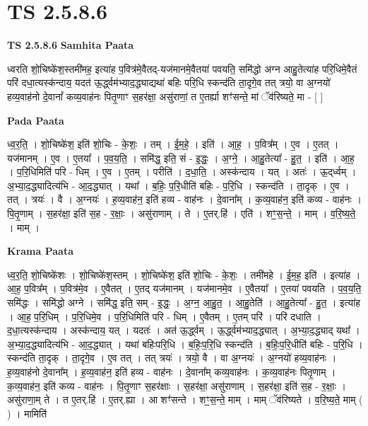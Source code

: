 \documentclass[17pt]{extarticle}
\begin{document}
\section{ TS 2.5.8.6 }

\textbf{TS 2.5.8.6 } \newline
\textbf{Samhita Paata} \newline

ध्वरति शो॒चिष्के॑श॒स्तमी॑मह॒ इत्या॑ह प॒वित्र॑मे॒वैतद्-यज॑मानमे॒वैतया॑ पवयति॒ समि॑द्धो अग्न आहु॒तेत्या॑ह परि॒धिमे॒वैतं परि॑ दधा॒त्यस्क॑न्दाय॒ यदत॑ ऊ॒र्द्ध्वम॑भ्याद॒द्ध्याद्यथा॑ बहिः परि॒धि स्कन्द॑ति ता॒दृगे॒व तत् त्रयो॒ वा अ॒ग्नयो॑ हव्य॒वाह॑नो दे॒वानां᳚ कव्य॒वाह॑नः पितृ॒णाꣳ स॒हर॑क्षा॒ असु॑राणां॒ त ए॒तर्ह्या शꣳ॑सन्ते॒ मां ॅव॑रिष्यते॒ मा - [  ] \newline

\textbf{Pada Paata} \newline

ध्व॒र॒ति॒ । शो॒चिष्के॑श॒ इति॑ शो॒चिः - के॒शः॒ । तम् । ई॒म॒हे॒ । इति॑ । आ॒ह॒ । प॒वित्र᳚म् । ए॒व । ए॒तत् । यज॑मानम् । ए॒व । ए॒तया᳚ । प॒व॒य॒ति॒ । समि॑द्ध॒ इति॒ सं - इ॒द्धः॒ । अ॒ग्ने॒ । आ॒हु॒तेत्या᳚ - हु॒त॒ । इति॑ । आ॒ह॒ । प॒रि॒धिमिति॑ परि - धिम् । ए॒व । ए॒तम् । परीति॑ । द॒धा॒ति॒ । अस्क॑न्दाय । यत् । अतः॑ । ऊ॒द्‌र्ध्वम् । अ॒भ्या॒द॒द्ध्यादित्य॑भि - आ॒द॒द्ध्यात् । यथा᳚ । ब॒हिः॒ प॒रि॒धीति॑ बहिः - प॒रि॒धि । स्कन्द॑ति । ता॒दृक् । ए॒व । तत् । त्रयः॑ । वै । अ॒ग्नयः॑ । ह॒व्य॒वाह॑न॒ इति॑ हव्य - वाह॑नः । दे॒वाना᳚म् । क॒व्य॒वाह॑न॒ इति॑ कव्य - वाह॑नः । पि॒तृ॒णाम् । स॒हर॑क्षा॒ इति॑ स॒ह - र॒क्षाः॒ । असु॑राणाम् । ते । ए॒तर्.हि॑ । एति॑ । शꣳ॒॒स॒न्ते॒ । माम् । व॒रि॒ष्य॒ते॒ । माम् ।  \newline


\textbf{Krama Paata} \newline

ध्व॒र॒ति॒ शो॒चिष्के॑शः । शो॒चिष्के॑श॒स्तम् । शो॒चिष्के॑श॒ इति॑ शो॒चिः - के॒शः॒ । तमी॑महे । ई॒म॒ह॒ इति॑ । इत्या॑ह । आ॒ह॒ प॒वित्र᳚म् । प॒वित्र॑मे॒व । ए॒वैतत् । ए॒तद् यज॑मानम् । यज॑मानमे॒व । ए॒वैतया᳚ । ए॒तया॑ पवयति । प॒व॒य॒ति॒ समि॑द्धः । समि॑द्धो अग्ने । समि॑द्ध॒ इति॒ सम् - इ॒द्धः॒ । अ॒ग्न॒ आ॒हु॒त॒ । आ॒हु॒तेति॑ । आ॒हु॒तेत्या᳚ - हु॒त॒ । इत्या॑ह । आ॒ह॒ प॒रि॒धिम् । प॒रि॒धिमे॒व । प॒रि॒धिमिति॑ परि - धिम् । ए॒वैतम् । ए॒तम् परि॑ । परि॑ दधाति । द॒धा॒त्यस्क॑न्दाय । अस्क॑न्दाय॒ यत् । यदतः॑ । अत॑ ऊ॒र्द्ध्वम् । ऊ॒र्द्ध्वम॑भ्याद॒द्ध्यात् । अ॒भ्या॒द॒द्ध्याद् यथा᳚ । अ॒भ्या॒द॒द्ध्यादित्य॑भि - आ॒द॒द्ध्यात् । यथा॑ बहिःपरि॒धि । ब॒हिः॒प॒रि॒धि स्कन्द॑ति । ब॒हिः॒प॒रि॒धीति॑ बहिः - प॒रि॒धि । स्कन्द॑ति ता॒दृक् । ता॒दृगे॒व । ए॒व तत् । तत् त्रयः॑ । त्रयो॒ वै । वा अ॒ग्नयः॑ । अ॒ग्नयो॑ हव्य॒वाह॑नः । ह॒व्य॒वाह॑नो दे॒वाना᳚म् । ह॒व्य॒वाह॑न॒ इति॑ हव्य - वाह॑नः । दे॒वाना᳚म् कव्य॒वाह॑नः । क॒व्य॒वाह॑नः पितृ॒णाम् । क॒व्य॒वाह॑न॒ इति॑ कव्य - वाह॑नः । पि॒तृ॒णाꣳ स॒हर॑क्षाः । स॒हर॑क्षा॒ असु॑राणाम् । स॒हर॑क्षा॒ इति॑ स॒ह - र॒क्षाः॒ । असु॑राणा॒म् ते । त ए॒तर्.हि॑ । ए॒तर्.ह्या । आ शꣳ॑सन्ते । शꣳ॒॒स॒न्ते॒ माम् । माम् ॅव॑रिष्यते । व॒रि॒ष्य॒ते॒ माम् ( ) । मामिति॑ \newline
\end{document}
